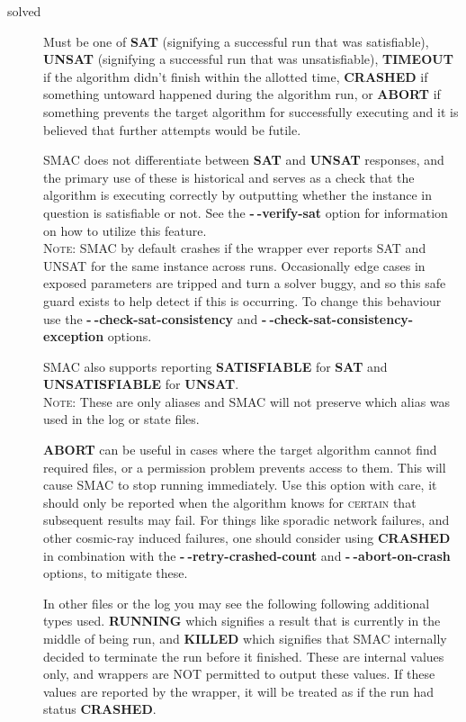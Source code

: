 \documentclass[manual.tex]{subfiles}
\begin{document}
\begin{description}

\item [{solved}] Must be one of \textbf{SAT} (signifying a successful run that was satisfiable), \textbf{UNSAT} (signifying a successful run that was unsatisfiable), \textbf{TIMEOUT} if the algorithm didn't finish within the allotted time, \textbf{CRASHED} if something untoward happened during the algorithm run, or \textbf{ABORT} if something prevents the target algorithm for successfully executing and it is believed that further attempts would be futile. 

SMAC does not differentiate between \textbf{SAT} and \textbf{UNSAT} responses, and the primary use of these is historical and serves as a check that the algorithm is executing correctly by outputting whether the instance in question is satisfiable or not. See the \textbf{-$\!~$-verify-sat} option for information on how to utilize this feature. 
\\
\textsc{Note:} SMAC by default crashes if the wrapper ever reports SAT and UNSAT for the same instance across runs. Occasionally edge cases in exposed parameters are tripped and turn a solver buggy, and so this safe guard exists to help detect if this is occurring. To change this behaviour use the \textbf{-$\!~$-check-sat-consistency} and \textbf{-$\!~$-check-sat-consistency-exception} options.

SMAC also supports reporting \textbf{SATISFIABLE} for \textbf{SAT} and \textbf{UNSATISFIABLE} for \textbf{UNSAT}.
\\ \textsc{Note:} These are only aliases and SMAC will not preserve which alias was used in the log or state files.

\textbf{ABORT} can be useful in
cases where the target algorithm cannot find required files, or a
permission problem prevents access to them. This will cause SMAC to
stop running immediately. Use this option with care, it should only be reported when the algorithm knows for \textsc{certain} that subsequent results may fail. For things like sporadic network failures, and other cosmic-ray induced failures, one should consider using \textbf{CRASHED} in combination with the \textbf{-$\!~$-retry-crashed-count}  and \textbf{-$~\!\!$-abort-on-crash} options, to mitigate these.

In other files or the log you may see the following following additional types used. \textbf{RUNNING} which signifies a result that is currently in the middle of being run, and \textbf{KILLED} which signifies that SMAC internally decided to terminate the run before it finished. These are internal values only, and wrappers are NOT permitted to output these values. If these values are reported by the wrapper, it will be treated as if the run had status \textbf{CRASHED}.


\end{description}
\end{document}
